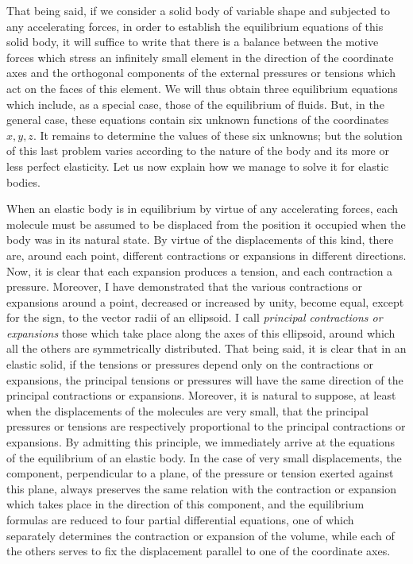 \documentclass[openright,smallroyalvopaper,8pt,twoside,showtrims]{memoir}
\begin{document}
That being said, if we consider a solid body of variable shape and subjected to any accelerating forces, in order to establish the equilibrium equations of this solid body, it will suffice to write that there is a balance between the motive forces which stress an infinitely small element in the direction of the coordinate axes and the orthogonal components of the external pressures or tensions which act on the faces of this element. We will thus obtain three equilibrium equations which include, as a special case, those of the equilibrium of fluids. But, in the general case, these equations contain six unknown functions of the coordinates $x, y, z$. It remains to determine the values of these six unknowns; but the solution of this last problem varies according to the nature of the body and its more or less perfect elasticity. Let us now explain how we manage to solve it for elastic bodies. 

When an elastic body is in equilibrium by virtue of any accelerating forces, each molecule must be assumed to be displaced from the position it occupied when the body was in its natural state. By virtue of the displacements of this kind, there are, around each point, different contractions or expansions in different directions. Now, it is clear that each expansion produces a tension, and each contraction a pressure. Moreover, I have demonstrated that the various contractions or expansions around a point, decreased or increased by unity, become equal, except for the sign, to the vector radii of an ellipsoid. I call \emph{principal contractions or expansions} those which take place along the axes of this ellipsoid, around which all the others are symmetrically distributed. That being said, it is clear that in an elastic solid, if the tensions or pressures depend only on the contractions or expansions, the principal tensions or pressures will have the same direction of the principal contractions or expansions. Moreover, it is natural to suppose, at least when the displacements of the molecules are very small, that the principal pressures or tensions are respectively proportional to the principal contractions or expansions. By admitting this principle, we immediately arrive at the equations of the equilibrium of an elastic body. In the case of very small displacements, the component, perpendicular to a plane, of the pressure or tension exerted against this plane, always preserves the same relation with the contraction or expansion which takes place in the direction of this component, and the equilibrium formulas are reduced to four partial differential equations, one of which separately determines the contraction or expansion of the volume, while each of the others serves to fix the displacement parallel to one of the coordinate axes. 
\end{document}
